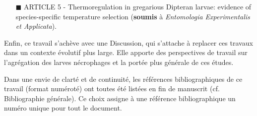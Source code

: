 \begin{itemize} 
\item[\tiny{$\blacksquare$}] ARTICLE 5 - Thermoregulation in gregarious Dipteran larvae: evidence of species-specific temperature selection (\textbf{soumis} à \textit{Entomologia Experimentalis et Applicata}).
\end{itemize}

Enfin, ce travail s'achève avec une Discussion, qui s'attache à replacer ces travaux dans un contexte évolutif plus large. Elle apporte des perspectives de travail sur l'agrégation des larves nécrophages et la portée plus générale de ces études.

Dans une envie de clarté et de continuité, les références bibliographiques de ce travail (format numéroté) ont toutes été listées en fin de manuscrit (cf. Bibliographie générale). Ce choix assigne à une référence bibliographique un numéro unique pour tout le document. 

\clearpage


    